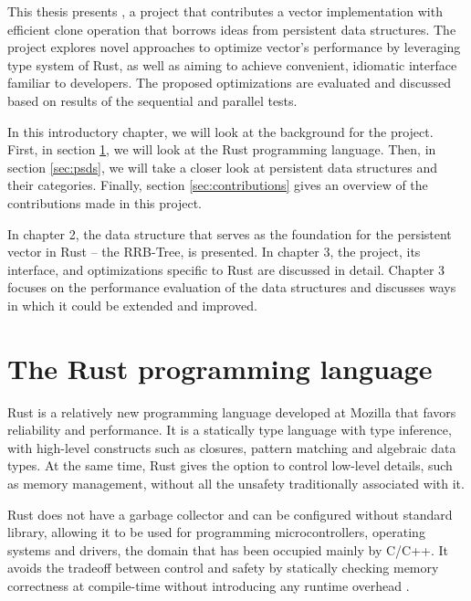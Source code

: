 This thesis presents \pvecrs{}, a project that contributes a vector implementation with efficient clone operation that borrows ideas from persistent data structures. The project explores novel approaches to optimize vector’s performance by leveraging type system of Rust, as well as aiming to achieve convenient, idiomatic interface familiar to developers. The proposed optimizations are evaluated and discussed based on results of the sequential and parallel tests.

In this introductory chapter, we will look at the background for the \pvecrs{} project. First, in section \ref{sec:rust}, we will look at the Rust programming language. Then, in section \ref{sec:psds}, we will take a closer look at persistent data structures and their categories. Finally, section \ref{sec:contributions} gives an overview of the contributions made in this project.

In chapter 2, the data structure that serves as the foundation for the persistent vector in Rust -- the RRB-Tree, is presented. In chapter 3, the \pvecrs{} project, its interface, and optimizations specific to Rust are discussed in detail. Chapter 3 focuses on the performance evaluation of the data structures and discusses ways in which it could be extended and improved.


\section{The Rust programming language}
\label{sec:rust}

Rust is a relatively new programming language developed at Mozilla that favors reliability and performance. It is a statically type language with type inference, with high-level constructs such as closures, pattern matching and algebraic data types. At the same time, Rust gives the option to control low-level details, such as memory management, without all the unsafety traditionally associated with it.

Rust does not have a garbage collector and can be configured without standard library, allowing it to be used for programming microcontrollers, operating systems and drivers, the domain that has been occupied mainly by C/C++. It avoids the tradeoff between control and safety by statically checking memory correctness at compile-time without introducing any runtime overhead \cite{reed-patina}.

